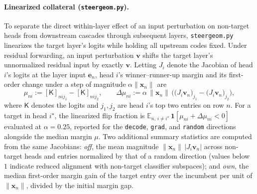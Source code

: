 \paragraph{Linearized collateral (\texttt{steergeom.py}).}
To separate the direct within-layer effect of an input perturbation on
non-target heads from downstream cascades through subsequent layers,
\texttt{steergeom.py} linearizes the target layer's logits while holding
all upstream codes fixed. Under residual forwarding, an input perturbation
$\mathbf{v}$ shifts the target layer's unnormalized residual input by
exactly $\mathbf{v}$. Letting $J_i$ denote the Jacobian of head $i$'s
logits at the layer input $\mathbf{e}_n$, head $i$'s winner--runner-up
margin and its first-order change under a step of magnitude
$\alpha\lVert\mathbf{x}_n\rVert$ are
\begin{equation}
	\mu_{ni} := [\mathsf{K}]_{nij_1} - [\mathsf{K}]_{nij_2},
	\qquad
	\Delta\mu_{ni} := \alpha\,\lVert\mathbf{x}_n\rVert\,
	\Big(\big(J_i\mathbf{v}_n\big)_{j_1} - \big(J_i\mathbf{v}_n\big)_{j_2}\Big),
	\label{eq:flip}
\end{equation}
where $\mathsf{K}$ denotes the logits and $j_1, j_2$ are head $i$'s top two
entries on row $n$. For a target in head $i^\star$, the linearized flip
fraction is $\mathbb{E}_{n,\,i \neq i^\star}\,\mathbf{1}[\mu_{ni} +
\Delta\mu_{ni} < 0]$ evaluated at $\alpha{=}0.25$, reported for the
\texttt{decode}, \texttt{grad}, and \texttt{random} directions alongside
the median margin $\mu$. Two additional summary statistics are computed
from the same Jacobians: \emph{off}, the mean magnitude
$\lVert\mathbf{x}_n\rVert\,\lvert J_i\mathbf{v}_n\rvert$ across non-target
heads and entries normalized by that of a random direction (values below
$1$ indicate reduced alignment with non-target classifier subspaces); and
\emph{own}, the median first-order margin gain of the target entry over the
incumbent per unit of $\lVert\mathbf{x}_n\rVert$, divided by the initial
margin gap.

